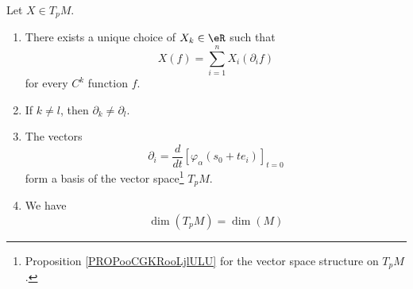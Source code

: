 \begin{proposition} \label{PROPooAAAXooKAMsfK}
	Let \( X\in T_pM\).
	\begin{enumerate}
		\item
		      There exists a unique choice of \( X_k\in \eR\) such that
		      \begin{equation}
			      X(f)=\sum_{i=1}^n X_i(\partial_if)
		      \end{equation}
		      for every \( C^k\) function \( f\).
		\item		\label{ITEMooLWEHooRQwZQW}
		      If \( k\neq l\), then \( \partial_k\neq \partial_l\).
		\item		\label{ITEMooJRPCooOGopSu}
		      The vectors
		      \begin{equation}
			      \partial_i=\frac{d}{dt} \left[ \varphi_{\alpha}(s_0+te_i)  \right]_{t=0}
		      \end{equation}
		      form a basis of the vector space\footnote{Proposition \ref{PROPooCGKRooLjlULU} for the vector space structure on \( T_pM\).} \( T_pM\).
		\item		\label{ITEMooPJHVooOHNSNP}
		      We have
		      \begin{equation}
			      \dim(T_pM)=\dim(M)
		      \end{equation}
	\end{enumerate}
\end{proposition}


